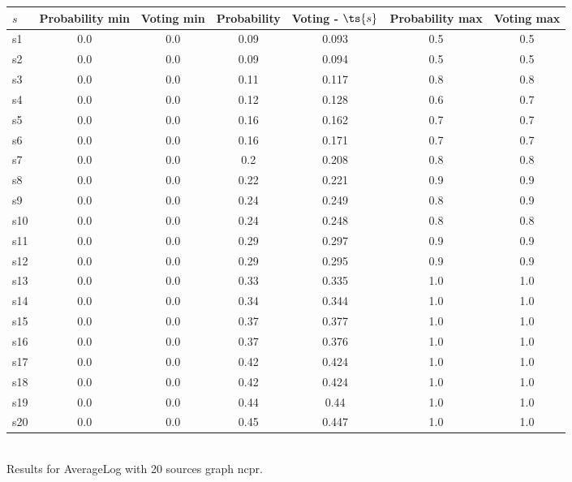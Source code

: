 \documentclass{article}
\begin{document}
\noindent\begin{tabular}{|l|c|c|c|c|c|c|}
\hline
$s$& Probability min & Voting min & Probability & Voting - $\ts{s}$ & Probability max & Voting max\\
\hline
s1 &0.0 & 0.0 & 0.09 & 0.093 & 0.5 & 0.5\\
\hline
s2 &0.0 & 0.0 & 0.09 & 0.094 & 0.5 & 0.5\\
\hline
s3 &0.0 & 0.0 & 0.11 & 0.117 & 0.8 & 0.8\\
\hline
s4 &0.0 & 0.0 & 0.12 & 0.128 & 0.6 & 0.7\\
\hline
s5 &0.0 & 0.0 & 0.16 & 0.162 & 0.7 & 0.7\\
\hline
s6 &0.0 & 0.0 & 0.16 & 0.171 & 0.7 & 0.7\\
\hline
s7 &0.0 & 0.0 & 0.2 & 0.208 & 0.8 & 0.8\\
\hline
s8 &0.0 & 0.0 & 0.22 & 0.221 & 0.9 & 0.9\\
\hline
s9 &0.0 & 0.0 & 0.24 & 0.249 & 0.8 & 0.9\\
\hline
s10 &0.0 & 0.0 & 0.24 & 0.248 & 0.8 & 0.8\\
\hline
s11 &0.0 & 0.0 & 0.29 & 0.297 & 0.9 & 0.9\\
\hline
s12 &0.0 & 0.0 & 0.29 & 0.295 & 0.9 & 0.9\\
\hline
s13 &0.0 & 0.0 & 0.33 & 0.335 & 1.0 & 1.0\\
\hline
s14 &0.0 & 0.0 & 0.34 & 0.344 & 1.0 & 1.0\\
\hline
s15 &0.0 & 0.0 & 0.37 & 0.377 & 1.0 & 1.0\\
\hline
s16 &0.0 & 0.0 & 0.37 & 0.376 & 1.0 & 1.0\\
\hline
s17 &0.0 & 0.0 & 0.42 & 0.424 & 1.0 & 1.0\\
\hline
s18 &0.0 & 0.0 & 0.42 & 0.424 & 1.0 & 1.0\\
\hline
s19 &0.0 & 0.0 & 0.44 & 0.44 & 1.0 & 1.0\\
\hline
s20 &0.0 & 0.0 & 0.45 & 0.447 & 1.0 & 1.0\\
\hline
\end{tabular}\\

\noindent Results for AverageLog with 20 sources graph ncpr.
\end{document}
